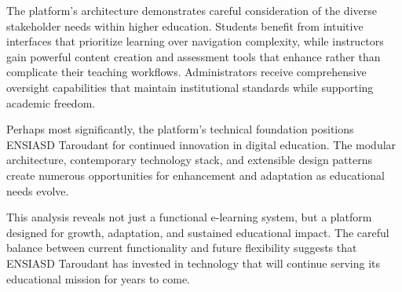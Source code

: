 \documentclass[12pt,a4paper]{article}
\begin{document}
The platform's architecture demonstrates careful consideration of the diverse stakeholder needs within higher education. Students benefit from intuitive interfaces that prioritize learning over navigation complexity, while instructors gain powerful content creation and assessment tools that enhance rather than complicate their teaching workflows. Administrators receive comprehensive oversight capabilities that maintain institutional standards while supporting academic freedom.

Perhaps most significantly, the platform's technical foundation positions ENSIASD Taroudant for continued innovation in digital education. The modular architecture, contemporary technology stack, and extensible design patterns create numerous opportunities for enhancement and adaptation as educational needs evolve.

This analysis reveals not just a functional e-learning system, but a platform designed for growth, adaptation, and sustained educational impact. The careful balance between current functionality and future flexibility suggests that ENSIASD Taroudant has invested in technology that will continue serving its educational mission for years to come.
\end{document}
